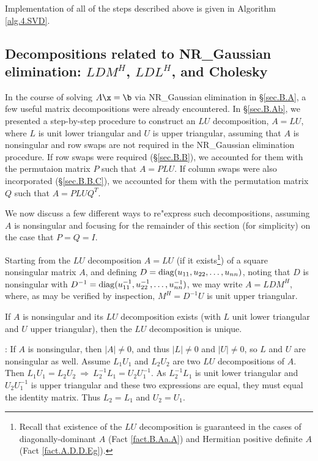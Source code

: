 Implementation of all of the steps described above is given in Algorithm \ref{alg.4.SVD}.

\clearpage
\subsection{Decompositions related to NR_Gaussian elimination: $LDM^{H}$, $LDL^{H}$, and Cholesky}\label{sec.A.D.I}

In the course of solving $A\x=\b$ via NR_Gaussian elimination
in \S \ref{sec.B.A}, a few useful matrix decompositions were already
encountered.  In \S \ref{sec.B.Ab}, we presented a step-by-step
procedure to construct an $LU$ decomposition, $A=LU$, where $L$ is
unit lower triangular and $U$ is upper triangular, assuming that $A$
is nonsingular and row swaps are not required in the NR_Gaussian
elimination procedure.  If row swaps were required (\S \ref{sec.B.B}),
we accounted for them with the permutaion matrix $P$ such that
$A=PLU$.  If column swaps were also incorporated (\S \ref{sec.B.B.C}),
we accounted for them with the permutation matrix $Q$ such that
$A=PLU\!Q^{T}$.

We now discuss a few different ways to re"express such
decompositions, assuming $A$ is nonsingular and focusing for the
remainder of this section (for simplicity) on the case that $P=Q=I$.

Starting from the $LU$ decomposition $A=LU$ (if it
exists\footnote{Recall that existence of the $LU$ decomposition is
guaranteed in the cases of diagonally-dominant $A$ (Fact \ref{fact.B.Aa.A})
and Hermitian positive definite $A$ (Fact \ref{fact.A.D.D.Eg}).}) of a square nonsingular matrix $A$, and
defining $D={\rm diag}(u_{11},u_{22},\ldots,u_{nn})$, noting that $D$
is nonsingular with $D^{-1}={\rm
diag}(u^{-1}_{11},u^{-1}_{22},\ldots,u^{-1}_{nn})$, we may write
$A=LDM^{H}$, where, as may be verified by inspection, $M^{H}=D^{-1}U$
is unit upper triangular.

\begin{fact} \label{fact.B.Aa.Az}
If $A$ is nonsingular and its $LU$ decomposition exists (with $L$ unit lower triangular
and $U$ upper triangular), then the $LU$ decomposition is unique.
\end{fact}

\/: If $A$ is nonsingular, then $|A|\ne 0$, and thus $|L|\ne 0$ and $|U|\ne 0$, so
$L$ and $U$ are nonsingular as well.  Assume $L_{1}U_{1}$ and $L_{2}U_{2}$ are two
$LU$ decompositions of $A$.  Then $L_{1}U_{1}=L_{2}U_{2}\ \Rightarrow\
L_{2}^{-1}L_{1}=U_{2}U_{1}^{-1}$.  As $L_{2}^{-1}L_{1}$ is unit lower
triangular and $U_{2}U_{1}^{-1}$ is upper triangular and these two
expressions are equal, they must equal the identity matrix.  Thus
$L_{2}=L_{1}$ and $U_{2}=U_{1}$.   \endproof \vskip0.1in

